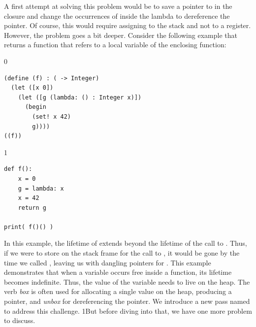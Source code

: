 \documentclass[7x10]{TimesAPriori_MIT}%
\def\racketEd{0}
\def\pythonEd{1}
\def\edition{1}
\newcommand{\pythonColor}[0]{}
\newcommand{\python}[1]{{\if\edition\pythonEd\pythonColor #1\fi}}
\numberwithin{theorem}{chapter}
\numberwithin{definition}{chapter}
\numberwithin{equation}{chapter}
\begin{document}
A first attempt at solving this problem would be to save a pointer to
 in the closure and change the occurrences of  inside
the lambda to dereference the pointer. Of course, this would require
assigning  to the stack and not to a register. However, the
problem goes a bit deeper.
Consider the following example that returns a function that refers to
a local variable of the enclosing function:
\begin{center}
\begin{minipage}{\textwidth}
{\if\edition\racketEd
\begin{lstlisting}
(define (f) : ( -> Integer)
  (let ([x 0])
    (let ([g (lambda: () : Integer x)])
      (begin
        (set! x 42)
        g))))
((f))
\end{lstlisting}
\fi}
{\if\edition\pythonEd\pythonColor
\begin{lstlisting}
def f():
    x = 0
    g = lambda: x
    x = 42
    return g

print( f()() )
\end{lstlisting}
\fi}
\end{minipage}
\end{center}
In this example, the lifetime of  extends beyond the lifetime
of the call to . Thus, if we were to store  on the
stack frame for the call to , it would be gone by the time we
called , leaving us with dangling pointers for
. This example demonstrates that when a variable occurs free
inside a function, its lifetime becomes indefinite. Thus, the value of
the variable needs to live on the heap.  The verb
\emph{box} is often used for allocating a single
value on the heap, producing a pointer, and
\emph{unbox} for dereferencing the pointer.
%
We introduce a new pass named  to address
this challenge.
%
\python{But before diving into that, we have one more
  problem to discuss.}
\end{document}
